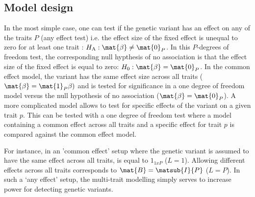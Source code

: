 \subsection{Model design}
\label{subsection:model-design}
In the most simple case, one can test if the genetic variant has an effect on any of the traits \(P\) (any effect test) i.e. the effect size of the fixed effect is unequal to zero for at least one trait : \(H_\text{A}: \mat{\beta} \ne \mat{0}_P\).  In this \(P\)-degrees of freedom test, the corresponding null hypthesis of no association is that the effect size of the fixed effect is equal to zero: \(H_0:\mat{\beta}  = \mat{0}_P\). In the common effect model, the variant has the same effect size across all traits (\(\mat{\beta}  = \mat{1}_P\beta)\) and is tested for significance in a one degree of freedom model versus the null hypothesis of no association (\(\mat{\beta}  = \mat{0}_P\)). A more complicated model allows to test for specific effects of the variant on a given trait \(p\). This can be tested with a one degree of freedom test where a model containing a common effect across all traits and a specific effect for trait \(p\) is compared against the common effect model.

For instance, in an 'common effect' setup where the genetic variant is assumed to have the same effect across all traits,   is equal to \(1_{1xP}\) (\(L=1\)). Allowing different effects across all traits corresponds to  \( \mat{B} =  \matsub{I}{P} \) (\(L=P\)). In such a `any effect' setup, the multi-trait modelling simply serves to increase power for detecting genetic variants. 